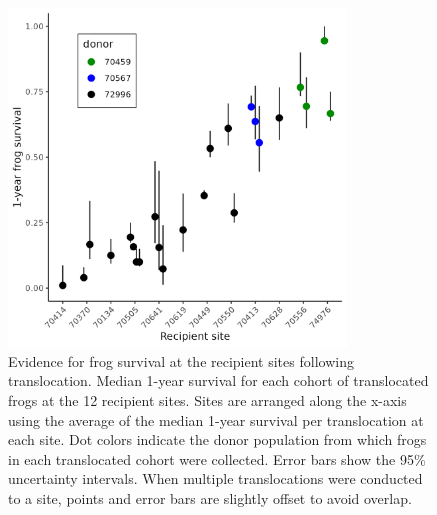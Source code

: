 \documentclass[9pt,twocolumn,twoside,lineno]{pnas-new}
\begin{document}
\begin{figure}

{\centering \includegraphics[width=0.8\textwidth]{figures/translocation_survival_bysiteid.png}

}

\caption{\label{fig-translocation-survival}Evidence for frog survival at
the recipient sites following translocation. Median 1-year survival for
each cohort of translocated frogs at the 12 recipient sites. Sites are
arranged along the x-axis using the average of the median 1-year
survival per translocation at each site. Dot colors indicate the donor
population from which frogs in each translocated cohort were collected.
Error bars show the 95\% uncertainty intervals. When multiple
translocations were conducted to a site, points and error bars are
slightly offset to avoid overlap.}

\end{figure}

\newpage
\end{document}
